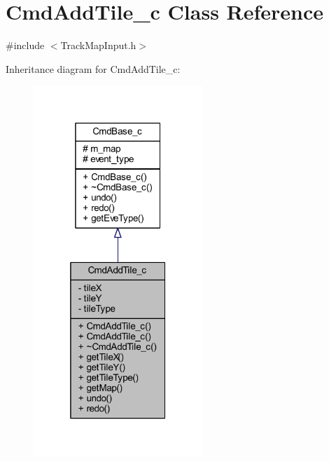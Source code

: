 \hypertarget{class_cmd_add_tile__c}{\section{Cmd\+Add\+Tile\+\_\+c Class Reference}
\label{class_cmd_add_tile__c}
}


{\ttfamily \#include $<$Track\+Map\+Input.\+h$>$}



Inheritance diagram for Cmd\+Add\+Tile\+\_\+c\+:
\nopagebreak
\begin{figure}[H]
\begin{center}
\leavevmode
\includegraphics[width=181pt]{class_cmd_add_tile__c__inherit__graph}
\end{center}
\end{figure}


